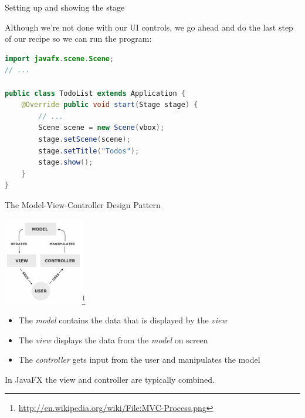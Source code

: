 \documentclass{beamer}
\begin{document}
\begin{frame}[fragile]{Setting up and showing the stage}

Although we're not done with our UI controls, we go ahead and do the last step of our recipe so we can run the program:

\begin{lstlisting}[language=Java]
import javafx.scene.Scene;
// ...

public class TodoList extends Application {
    @Override public void start(Stage stage) {
        // ...
        Scene scene = new Scene(vbox);
        stage.setScene(scene);
        stage.setTitle("Todos");
        stage.show();
    }
}
\end{lstlisting}


\end{frame}


\begin{frame}[fragile]{The Model-View-Controller Design Pattern}
\vspace{-.1in}
\begin{center}
\includegraphics[height=1.5in]{MVC-Process.png}\footnote{\url{http://en.wikipedia.org/wiki/File:MVC-Process.png}}
\end{center}
\vspace{-.1in}
\begin{itemize}
\item The {\it model} contains the data that is displayed by the {\it view}
\item The {\it view} displays the data from the {\it model} on screen
\item The {\it controller} gets input from the user and manipulates the model
\end{itemize}
In JavaFX the view and controller are typically combined.

\end{frame}
\end{document}
